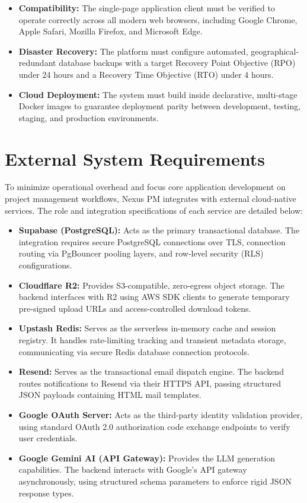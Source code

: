 \begin{itemize}
    \item \textbf{Compatibility:} The single-page application client must be verified to operate correctly across all modern web browsers, including Google Chrome, Apple Safari, Mozilla Firefox, and Microsoft Edge.
    \item \textbf{Disaster Recovery:} The platform must configure automated, geographical-redundant database backups with a target Recovery Point Objective (RPO) under 24 hours and a Recovery Time Objective (RTO) under 4 hours.
    \item \textbf{Cloud Deployment:} The system must build inside declarative, multi-stage Docker images to guarantee deployment parity between development, testing, staging, and production environments.
\end{itemize}

\section{External System Requirements}
To minimize operational overhead and focus core application development on project management workflows, Nexus PM integrates with external cloud-native services. The role and integration specifications of each service are detailed below:

\begin{itemize}
    \item \textbf{Supabase (PostgreSQL):} Acts as the primary transactional database. The integration requires secure PostgreSQL connections over TLS, connection routing via PgBouncer pooling layers, and row-level security (RLS) configurations.
    \item \textbf{Cloudflare R2:} Provides S3-compatible, zero-egress object storage. The backend interfaces with R2 using AWS SDK clients to generate temporary pre-signed upload URLs and access-controlled download tokens.
    \item \textbf{Upstash Redis:} Serves as the serverless in-memory cache and session registry. It handles rate-limiting tracking and transient metadata storage, communicating via secure Redis database connection protocols.
    \item \textbf{Resend:} Serves as the transactional email dispatch engine. The backend routes notifications to Resend via their HTTPS API, passing structured JSON payloads containing HTML mail templates.
    \item \textbf{Google OAuth Server:} Acts as the third-party identity validation provider, using standard OAuth 2.0 authorization code exchange endpoints to verify user credentials.
    \item \textbf{Google Gemini AI (API Gateway):} Provides the LLM generation capabilities. The backend interacts with Google's API gateway asynchronously, using structured schema parameters to enforce rigid JSON response types.
\end{itemize}

